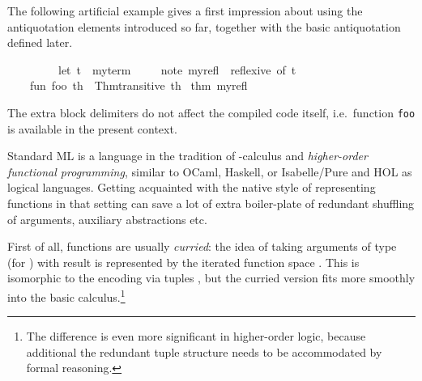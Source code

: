 \begin{isabellebody}
\begin{isamarkuptext}
\begin{description}
  \end{description}%
\end{isamarkuptext}%
\isamarkuptrue%
%
\endisatagmlantiq
{\isafoldmlantiq}%
%
\isadelimmlantiq
%
\endisadelimmlantiq
%
\isadelimmlex
%
\endisadelimmlex
%
\isatagmlex
%
\begin{isamarkuptext}%
The following artificial example gives a first
  impression about using the antiquotation elements introduced so far,
  together with the basic  antiquotation defined
  later.%
\end{isamarkuptext}%
\isamarkuptrue%
%
\endisatagmlex
{\isafoldmlex}%
%
\isadelimmlex
%
\endisadelimmlex
%
\isadelimML
%
\endisadelimML
%
\isatagML
{}\isamarkupfalse%
\ {\isacharverbatimopen}\isanewline
\ \ {\isaantiqopen}\isanewline
\ \ \ \ %
\isaantiq
let\ {\isacharquery}t\ {\isacharequal}\ my{\isacharunderscore}term%
\endisaantiq
\isanewline
\ \ \ \ %
\isaantiq
note\ my{\isacharunderscore}refl\ {\isacharequal}\ reflexive\ {\isacharbrackleft}of\ {\isacharquery}t{\isacharbrackright}%
\endisaantiq
\isanewline
\ \ \ \ fun\ foo\ th\ {\isacharequal}\ Thm{\isachardot}transitive\ th\ %
\isaantiq
thm\ my{\isacharunderscore}refl%
\endisaantiq
\isanewline
\ \ {\isaantiqclose}\isanewline
{\isacharverbatimclose}%
\endisatagML
{\isafoldML}%
%
\isadelimML
%
\endisadelimML
%
\begin{isamarkuptext}%
The extra block delimiters do not affect the compiled code itself, i.e.\
  function \verb|foo| is available in the present context.%
\end{isamarkuptext}%
\isamarkuptrue%
%
\isamarkupsection{Canonical argument order \label{sec:canonical-argument-order}%
}
\isamarkuptrue%
%
\begin{isamarkuptext}%
Standard ML is a language in the tradition of \isa{{\isasymlambda}}-calculus and \emph{higher-order functional programming},
  similar to OCaml, Haskell, or Isabelle/Pure and HOL as logical
  languages.  Getting acquainted with the native style of representing
  functions in that setting can save a lot of extra boiler-plate of
  redundant shuffling of arguments, auxiliary abstractions etc.

  First of all, functions are usually \emph{curried}: the idea of
  \isa{f} taking \isa{n} arguments of type  (for
  ) with result \isa{{\isasymtau}} is represented by
  the iterated function space .  This is
  isomorphic to the encoding via tuples \isa{{\isasymtau}\isactrlsub {\isadigit{1}}\ {\isasymtimes}\ {\isasymdots}\ {\isasymtimes}\ {\isasymtau}\isactrlsub n\ {\isasymrightarrow}\ {\isasymtau}}, but
  the curried version fits more smoothly into the basic
  calculus.\footnote{The difference is even more significant in
  higher-order logic, because additional the redundant tuple structure
  needs to be accommodated by formal reasoning.}


\end{isamarkuptext}
\end{isabellebody}
